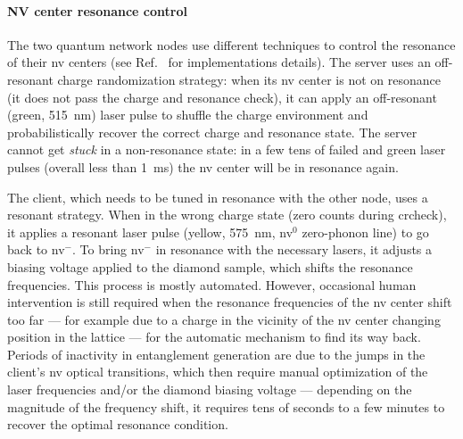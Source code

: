 \paragraph{NV center resonance control}

The two quantum network nodes use different techniques to control the resonance of their
\acrshort{nv} centers (see Ref.~\cite{pompili_2021_multinode} for implementations details). The
server uses an off-resonant charge randomization strategy: when its \acrshort{nv} center is not on
resonance (it does not pass the charge and resonance check), it can apply an off-resonant (green,
\qty{515}{\nm}) laser pulse to shuffle the charge environment and probabilistically recover the
correct charge and resonance state. The server cannot get \emph{stuck} in a non-resonance state: in
a few tens of failed  and green laser pulses (overall less than \qty{1}{\ms})
the \acrshort{nv} center will be in resonance again.

The client, which needs to be tuned in resonance with the other node, uses a resonant strategy. When
in the wrong charge state (zero counts during \acrshort{crcheck}), it applies a resonant laser pulse
(yellow, \qty{575}{\nm}, \acrshort{nv}${}^0$ zero-phonon line) to go back to \acrshort{nv}${}^-$. To
bring \acrshort{nv}${}^-$ in resonance with the necessary lasers, it adjusts a biasing voltage
applied to the diamond sample, which shifts the resonance frequencies. This process is mostly
automated. However, occasional human intervention is still required when the resonance frequencies
of the \acrshort{nv} center shift too far --- for example due to a charge in the vicinity of the
\acrshort{nv} center changing position in the lattice --- for the automatic mechanism to find its
way back. Periods of inactivity in entanglement generation are due to the jumps in the client's
\acrshort{nv} optical transitions, which then require manual optimization of the laser frequencies
and/or the diamond biasing voltage --- depending on the magnitude of the frequency shift, it
requires tens of seconds to a few minutes to recover the optimal resonance condition.

\printbibliography[heading=subbibintoc,title={References}]
